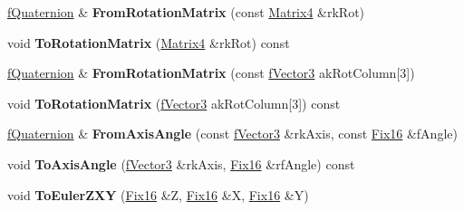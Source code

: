 \begin{DoxyCompactItemize}
\item 
\hyperlink{class_i_dream_sky_1_1f_quaternion}{f\+Quaternion} \& {\bfseries From\+Rotation\+Matrix} (const \hyperlink{class_i_dream_sky_1_1_matrix4}{Matrix4} \&rk\+Rot)\hypertarget{class_i_dream_sky_1_1f_quaternion_ab86de8e2f5ee758bdf03f679fa8cbc03}{}\label{class_i_dream_sky_1_1f_quaternion_ab86de8e2f5ee758bdf03f679fa8cbc03}

\item 
void {\bfseries To\+Rotation\+Matrix} (\hyperlink{class_i_dream_sky_1_1_matrix4}{Matrix4} \&rk\+Rot) const \hypertarget{class_i_dream_sky_1_1f_quaternion_a0fd635692944c8939a978be69aafa3ae}{}\label{class_i_dream_sky_1_1f_quaternion_a0fd635692944c8939a978be69aafa3ae}

\item 
\hyperlink{class_i_dream_sky_1_1f_quaternion}{f\+Quaternion} \& {\bfseries From\+Rotation\+Matrix} (const \hyperlink{class_i_dream_sky_1_1f_vector3}{f\+Vector3} ak\+Rot\+Column\mbox{[}3\mbox{]})\hypertarget{class_i_dream_sky_1_1f_quaternion_aeb82011e1db39466923451a43b64caa6}{}\label{class_i_dream_sky_1_1f_quaternion_aeb82011e1db39466923451a43b64caa6}

\item 
void {\bfseries To\+Rotation\+Matrix} (\hyperlink{class_i_dream_sky_1_1f_vector3}{f\+Vector3} ak\+Rot\+Column\mbox{[}3\mbox{]}) const \hypertarget{class_i_dream_sky_1_1f_quaternion_af591e38594c9667da1643087e3d6ff37}{}\label{class_i_dream_sky_1_1f_quaternion_af591e38594c9667da1643087e3d6ff37}

\item 
\hyperlink{class_i_dream_sky_1_1f_quaternion}{f\+Quaternion} \& {\bfseries From\+Axis\+Angle} (const \hyperlink{class_i_dream_sky_1_1f_vector3}{f\+Vector3} \&rk\+Axis, const \hyperlink{class_i_dream_sky_1_1_fix_point}{Fix16} \&f\+Angle)\hypertarget{class_i_dream_sky_1_1f_quaternion_a577ea0be5e24a6e518f6c907927a6d70}{}\label{class_i_dream_sky_1_1f_quaternion_a577ea0be5e24a6e518f6c907927a6d70}

\item 
void {\bfseries To\+Axis\+Angle} (\hyperlink{class_i_dream_sky_1_1f_vector3}{f\+Vector3} \&rk\+Axis, \hyperlink{class_i_dream_sky_1_1_fix_point}{Fix16} \&rf\+Angle) const \hypertarget{class_i_dream_sky_1_1f_quaternion_aea99b1605ff0ac38b39bc7bafd35d3c0}{}\label{class_i_dream_sky_1_1f_quaternion_aea99b1605ff0ac38b39bc7bafd35d3c0}

\item 
void {\bfseries To\+Euler\+Z\+XY} (\hyperlink{class_i_dream_sky_1_1_fix_point}{Fix16} \&Z, \hyperlink{class_i_dream_sky_1_1_fix_point}{Fix16} \&X, \hyperlink{class_i_dream_sky_1_1_fix_point}{Fix16} \&Y)\hypertarget{class_i_dream_sky_1_1f_quaternion_a3113b5b8532a54016d29766874461fc5}{}\label{class_i_dream_sky_1_1f_quaternion_a3113b5b8532a54016d29766874461fc5}


\end{DoxyCompactItemize}
